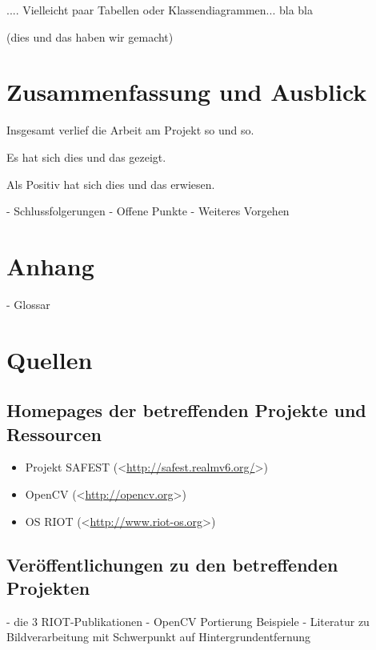 \documentclass[10pt,a4paper]{article}
\begin{document}
.... Vielleicht paar Tabellen oder Klassendiagrammen...  bla bla

(dies und das haben wir gemacht)


\newpage
\section{Zusammenfassung und Ausblick}

Insgesamt verlief die Arbeit am Projekt so und so.

Es hat sich dies und das gezeigt.

Als Positiv hat sich dies und das erwiesen.

- Schlussfolgerungen
- Offene Punkte
- Weiteres Vorgehen

\newpage
\section{Anhang}

- Glossar


\newpage
\section{Quellen}

\subsection*{Homepages der betreffenden Projekte und Ressourcen}
\begin{itemize}
\item Projekt SAFEST (\textless\href{http://safest.realmv6.org/}{http://safest.realmv6.org/}\textgreater)
\item OpenCV (\textless\href{http://opencv.org}{http://opencv.org}\textgreater)
\item OS RIOT (\textless\href{http://www.riot-os.org}{http://www.riot-os.org}\textgreater)
\end{itemize}

\subsection*{Veröffentlichungen zu den betreffenden Projekten} 
- die 3 RIOT-Publikationen
- OpenCV Portierung Beispiele
- Literatur zu Bildverarbeitung mit Schwerpunkt auf Hintergrundentfernung
\end{document}
